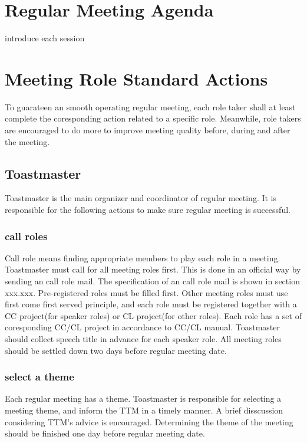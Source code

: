 \section{Regular Meeting Agenda}

introduce each session


\section{Meeting Role Standard Actions}

To guarateen an smooth operating regular meeting, each role taker shall 
at least complete the coresponding action related to a specific role. Meanwhile, 
role takers are encouraged to do more to improve meeting quality before, during 
and after the meeting.

\subsection{Toastmaster}

Toastmaster is the main organizer and coordinator of regular meeting. 
It is responsible for the following actions to make sure regular meeting 
is successful.

\subsubsection{call roles}

Call role means finding appropriate members to play each role in a meeting. 
Toastmaster must call for all meeting roles first. This is done in an official
way by sending an call role mail. The specification of an call role mail is shown
in section xxx.xxx. Pre-registered roles must be filled first. Other meeting roles
must use first come first served principle, and each role must be registered together
with a CC project(for speaker roles) or CL project(for other roles). Each role has 
a set of coresponding CC/CL project in accordance to CC/CL manual. Toastmaster 
should collect speech title in advance for each speaker role. All meeting roles
should be settled down two days before regular meeting date. 

\subsubsection{select a theme}
Each regular meeting has a theme. Toastmaster is responsible for selecting a meeting
theme, and inform the TTM in a timely manner. A brief disscussion considering TTM's 
advice is encouraged. Determining the theme of the meeting should be finished one day 
before regular meeting date.

